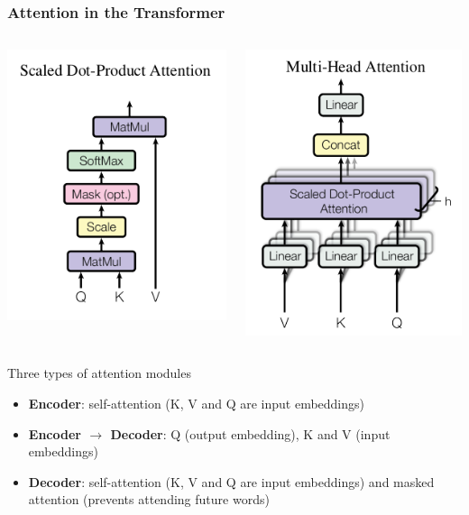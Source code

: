 \documentclass[10pt]{beamer}
\begin{document}
\begin{frame}
  \frametitle{Attention in the Transformer}

  \begin{columns}
\begin{center}
	\includegraphics[width=.55\columnwidth]{images/att1}
\end{center}
\begin{center}
	\includegraphics[width=.47\columnwidth]{images/att2}
\end{center}
    \end{columns}
Three types of attention modules
\begin{itemize}
\item \textbf{Encoder}: self-attention (K, V and Q are input embeddings) 
\item \textbf{Encoder $\rightarrow$ Decoder}: Q (output embedding), K and V (input embeddings) 
\item \textbf{Decoder}: self-attention (K, V and Q are input embeddings)
and masked attention (prevents attending future words)
\end{itemize}

\end{frame}
\end{document}
